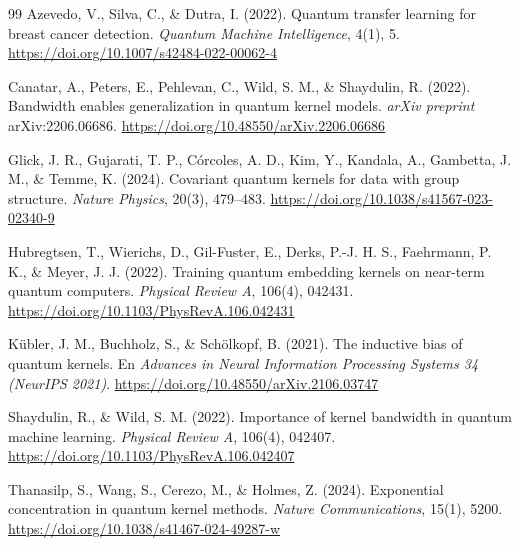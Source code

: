 \begin{thebibliography}{99}
    Azevedo, V., Silva, C., \& Dutra, I. (2022). Quantum transfer learning for breast
    cancer detection. \textit{Quantum Machine Intelligence}, 4(1), 5.
    \url{https://doi.org/10.1007/s42484-022-00062-4}


    Canatar, A., Peters, E., Pehlevan, C., Wild, S. M., \& Shaydulin, R. (2022).
    Bandwidth enables generalization in quantum kernel models.
    \textit{arXiv preprint} arXiv:2206.06686.
    \url{https://doi.org/10.48550/arXiv.2206.06686}

    Glick, J. R., Gujarati, T. P., C{\'{o}}rcoles, A. D., Kim, Y., Kandala, A., Gambetta, J. M., \& Temme, K. (2024).
    Covariant quantum kernels for data with group structure.
    \textit{Nature Physics}, 20(3), 479--483.
    \url{https://doi.org/10.1038/s41567-023-02340-9}

    Hubregtsen, T., Wierichs, D., Gil-Fuster, E., Derks, P.-J. H. S., Faehrmann, P. K., \& Meyer, J. J. (2022).
    Training quantum embedding kernels on near-term quantum computers.
    \textit{Physical Review A}, 106(4), 042431.
    \url{https://doi.org/10.1103/PhysRevA.106.042431}

    K\"ubler, J. M., Buchholz, S., \& Sch\"olkopf, B. (2021).
    The inductive bias of quantum kernels.
    En \textit{Advances in Neural Information Processing Systems 34 (NeurIPS 2021)}.
    \url{https://doi.org/10.48550/arXiv.2106.03747}

    Shaydulin, R., \& Wild, S. M. (2022).
    Importance of kernel bandwidth in quantum machine learning.
    \textit{Physical Review A}, 106(4), 042407.
    \url{https://doi.org/10.1103/PhysRevA.106.042407}

    Thanasilp, S., Wang, S., Cerezo, M., \& Holmes, Z. (2024).
    Exponential concentration in quantum kernel methods.
    \textit{Nature Communications}, 15(1), 5200.
    \url{https://doi.org/10.1038/s41467-024-49287-w}
\end{thebibliography}
